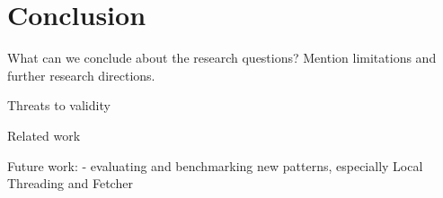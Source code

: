 \chapter{Conclusion}

What can we conclude about the research questions? Mention limitations and further research directions.

Threats to validity

Related work

Future work:
- evaluating and benchmarking new patterns, especially Local Threading and Fetcher

